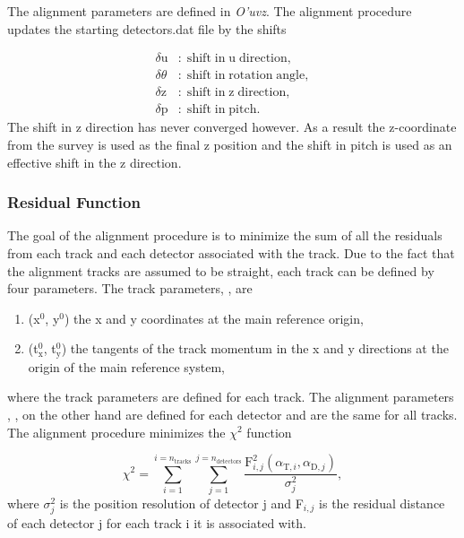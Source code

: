 The alignment parameters are defined in \textit{O'uvz}.  The alignment procedure
updates the starting detectors.dat file by the shifts

\begin{align}
  \delta \mathrm{u} & \mathrm{: \; shift \; in \; u \; direction,}  \\
  \delta \theta & \mathrm{: \; shift \; in \; rotation \; angle,}  \\
  \delta \mathrm{z} & \mathrm{: \; shift \; in \; z \; direction,}  \\
  \delta \mathrm{p} & \mathrm{: \; shift \; in \; pitch.} 
\end{align}
\noindent
The shift in z direction has never converged however.  As a result the
z-coordinate from the survey is used as the final z position and the shift in
pitch is used as an effective shift in the z direction.

\subsubsection{Residual Function}

The goal of the alignment procedure is to minimize the sum of all the residuals
from each track and each detector associated with the track.  Due to the fact
that the alignment tracks are assumed to be straight, each track can be defined
by four parameters.  The track parameters, {\atrack}, are

\begin{enumerate}[label=\roman*:]
\item (x$^0$, y$^0$) the x and y coordinates at the main reference origin,
\item (t$_{\mathrm{x}}^0$, t$_{\mathrm{y}}^0$) the tangents of the track
  momentum in the x and y directions at the origin of the main reference system,
\end{enumerate}
\noindent
where the track parameters are defined for each track.  The alignment parameters
, {\adet}, on the other hand are defined for each detector and are the same for
all tracks.  The alignment procedure minimizes the $\chi^2$ function

\begin{equation}
  \chi^2 =
  \sum_{i=1}^{i=n_{\mathrm{tracks}}}\sum_{j=1}^{j=n_{\mathrm{detectors}}}
  \frac{\mathrm{F}^2_{i,j}(\alpha_{\mathrm{T}, i}, \alpha_{\mathrm{D},
      j})}{\sigma_j^2},
  \label{equ::chi_align}%
\end{equation}
\noindent
where $\sigma^2_j$ is the position resolution of detector j and F$_{i,j}$ is the
residual distance of each detector j for each track i it is associated with.

